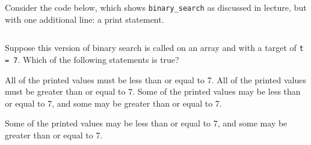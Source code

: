 \begin{prob}

    Consider the code below, which shows \texttt{binary_search} as discussed in 
    lecture, but with one additional line: a print statement.

    \inputminted{python}{./code.py}

    Suppose this version of binary search is called on an array and with a target
    of \texttt{t = 7}. Which of the following statements is true?

    \begin{choices}
        \choice All of the printed values must be less than or equal to 7.
        \choice All of the printed values must be greater than or equal to 7.
        \correctchoice Some of the printed values may be less than or equal to 7, and some may be greater than or
        equal to 7.
    \end{choices}


    \begin{soln}
        Some of the printed values may be less than or equal to 7, and some may be greater than or
        equal to 7.
    \end{soln}


\end{prob}
